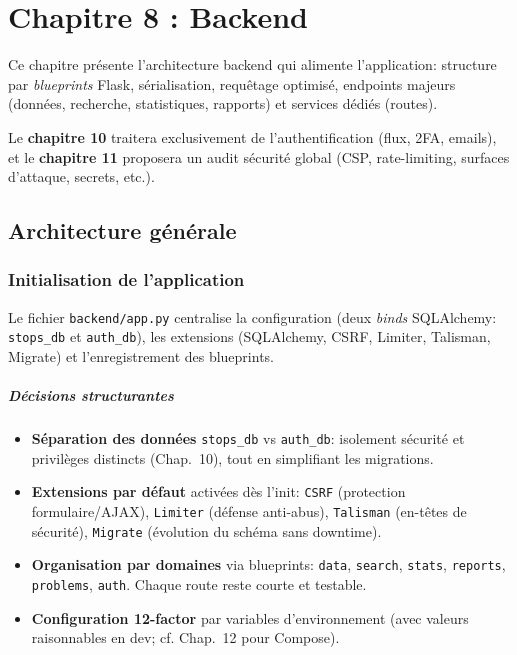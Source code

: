 \chapter{Chapitre 8 : Backend}

Ce chapitre présente l'architecture backend qui alimente l'application: structure par \textit{blueprints} Flask, sérialisation, requêtage optimisé, endpoints majeurs (données, recherche, statistiques, rapports) et services dédiés (routes).

Le \textbf{chapitre 10} traitera exclusivement de l'authentification (flux, 2FA, emails), et le \textbf{chapitre 11} proposera un audit sécurité global (CSP, rate-limiting, surfaces d'attaque, secrets, etc.).

\section{Architecture générale}
\subsection*{Initialisation de l'application}

Le fichier \texttt{backend/app.py} centralise la configuration (deux \textit{binds} SQLAlchemy: \texttt{stops\_db} et \texttt{auth\_db}), les extensions (SQLAlchemy, CSRF, Limiter, Talisman, Migrate) et l'enregistrement des blueprints.

\paragraph{Décisions structurantes}
\begin{itemize}
  \item \textbf{Séparation des données} \texttt{stops\_db} vs \texttt{auth\_db}: isolement sécurité et privilèges distincts (Chap.~10), tout en simplifiant les migrations.
  \item \textbf{Extensions par défaut} activées dès l'init: \texttt{CSRF} (protection formulaire/AJAX), \texttt{Limiter} (défense anti-abus), \texttt{Talisman} (en-têtes de sécurité), \texttt{Migrate} (évolution du schéma sans downtime).
  \item \textbf{Organisation par domaines} via blueprints: \texttt{data}, \texttt{search}, \texttt{stats}, \texttt{reports}, \texttt{problems}, \texttt{auth}. Chaque route reste courte et testable.
  \item \textbf{Configuration 12-factor} par variables d'environnement (avec valeurs raisonnables en dev; cf. Chap.~12 pour Compose).
\end{itemize}

